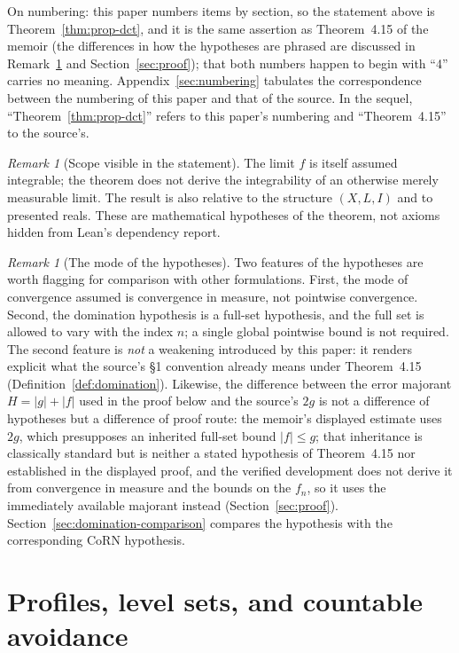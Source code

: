 \documentclass[11pt]{article}
\theoremstyle{definition}
\theoremstyle{remark}
\newtheorem{remark}[theorem]{Remark}
\begin{document}
On numbering: this paper numbers items by section, so the statement above is Theorem~\ref{thm:prop-dct}, and it is the same assertion as Theorem~4.15 of the memoir (the differences in how the hypotheses are phrased are discussed in Remark~\ref{rem:weaker} and Section~\ref{sec:proof}); that both numbers happen to begin with ``4'' carries no meaning.  Appendix~\ref{sec:numbering} tabulates the correspondence between the numbering of this paper and that of the source.  In the sequel, ``Theorem~\ref{thm:prop-dct}'' refers to this paper's numbering and ``Theorem~4.15'' to the source's.

\begin{remark}[Scope visible in the statement]
\label{rem:scope}
The limit $f$ is itself assumed integrable; the theorem does not derive the integrability of an otherwise merely measurable limit.  The result is also relative to the structure $(X,L,I)$ and to presented reals.  These are mathematical hypotheses of the theorem, not axioms hidden from Lean's dependency report.
\end{remark}

\begin{remark}[The mode of the hypotheses]
\label{rem:weaker}
Two features of the hypotheses are worth flagging for comparison with other formulations.  First, the mode of convergence assumed is convergence in measure, not pointwise convergence.  Second, the domination hypothesis is a full-set hypothesis, and the full set is allowed to vary with the index $n$; a single global pointwise bound is not required.  The second feature is \emph{not} a weakening introduced by this paper: it renders explicit what the source's \S1 convention already means under Theorem~4.15 (Definition~\ref{def:domination}).  Likewise, the difference between the error majorant $H=|g|+|f|$ used in the proof below and the source's $2g$ is not a difference of hypotheses but a difference of proof route: the memoir's displayed estimate uses $2g$, which presupposes an inherited full-set bound $|f|\le g$; that inheritance is classically standard but is neither a stated hypothesis of Theorem~4.15 nor established in the displayed proof, and the verified development does not derive it from convergence in measure and the bounds on the $f_n$, so it uses the immediately available majorant instead (Section~\ref{sec:proof}).  Section~\ref{sec:domination-comparison} compares the hypothesis with the corresponding CoRN hypothesis.
\end{remark}

\section{Profiles, level sets, and countable avoidance}
\label{sec:profile-theory}
\end{document}

